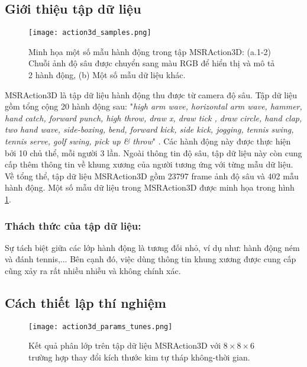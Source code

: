 \subsection{Giới thiệu tập dữ liệu}
\begin{figure}
\centering
\texttt{[image: action3d\_samples.png]}
\caption{Minh họa một số mẫu hành động trong tập MSRAction3D: (a.1-2) Chuỗi ảnh độ sâu được chuyển sang màu RGB để hiển thị và mô tả 2 hành động, (b) Một số mẫu dữ liệu khác.\cite{Wu_LOP2012}}
\label{fig_action3d}
\end{figure}
MSRAction3D là tập dữ liệu hành động thu được từ camera độ sâu. Tập dữ liệu gồm tổng cộng 20 hành động sau: "\textit{high arm wave, horizontal arm wave, hammer, hand catch, forward punch, high throw, draw x, draw tick , draw circle, hand clap, two hand wave, side-boxing, bend, forward kick, side kick, jogging, tennis swing, tennis serve, golf swing, pick up \& throw}" \cite{Wu_LOP2012}. Các hành động này được thực hiện bởi 10 chủ thể, mỗi người 3 lần. Ngoài thông tin độ sâu, tập dữ liệu này còn cung cấp thêm thông tin về khung xương của người tương ứng với từng mẫu dữ liệu. Về tổng thể, tập dữ liệu MSRAction3D gồm 23797 frame ảnh độ sâu và 402 mẫu hành động. Một số mẫu dữ liệu trong MSRAction3D được minh họa trong hình \ref{fig_action3d}.

\subsubsection{Thách thức của tập dữ liệu:} Sự tách biệt giữa các lớp hành động là tương đối nhỏ, ví dụ như: hành động ném và đánh tennis,... Bên cạnh đó, việc dùng thông tin khung xương được cung cấp cũng xảy ra rất nhiều nhiễu và không chính xác.
\subsection{Cách thiết lập thí nghiệm}
\begin{figure}
\centering
\texttt{[image: action3d\_params\_tunes.png]}
\caption{Kết quả phân lớp trên tập dữ liệu MSRAction3D với $8\times 8\times 6$ trường hợp thay đổi kích thước kim tự tháp không-thời gian.}
\label{fig_action3d_params_tune}
\end{figure}

